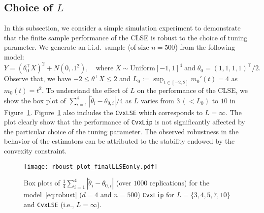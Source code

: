 {%

\subsection{Choice of \texorpdfstring{$L$}{Lg}} %
\label{sub:robustness_of_choice_of_}
In this subsection, we consider a simple simulation experiment to demonstrate that the finite sample performance of the CLSE is robust to  the choice of tuning parameter. We generate an i.i.d.~sample (of size $n= 500$) from the following model:
\begin{equation}\label{eq:robust}
Y=(\theta_0^\top X)^2 + N(0, .1^2), \quad \text{where}\; X \sim \text{Uniform} [-1, 1]^4\; \text{and} \; \theta_0 = (1,1,1,1)^\top/2.
\end{equation}
Observe that, we have   $-2 \le \theta^\top X \le 2$ and  $L_0:= \sup_{t \in [-2,2]} m_0'(t)= 4$ as $m_0(t)= t^2.$ To understand the effect of $L$ on the performance of the CLSE,  we  show the box plot of $\sum_{i=1}^4|\check{\theta}_i-\theta_{0,i}|/4$  as $L$ varies from $3\, (< L_0)$ to $10$ in Figure~\ref{fig:robust}. Figure~\ref{fig:robust} also includes the \texttt{CvxLSE} which corresponds to $L=\infty$.  The plot clearly show that the performance of \texttt{CvxLip}  is not significantly affected by the particular choice of the tuning parameter. The observed robustness in the behavior of the estimators can be attributed to the stability endowed  by the convexity constraint.
\begin{figure}[!ht]
\centering
\texttt{[image: rboust\_plot\_finalLLSEonly.pdf]}\\ %
\caption[Boxplots of estimates to study their robustness]{Box plots of $\frac{1}{4}\sum_{i=1}^4|\tilde{\theta}_i-\theta_{0,i}|$ (over $1000$ replications) for the model~\eqref{eq:robust} ($d=4$ and $n=500$) \texttt{CvxLip} for $L= \{3, 4, 5,7, 10\}$ and \texttt{CvxLSE} (i.e., $L=\infty$). }
\label{fig:robust}
\end{figure}
}
